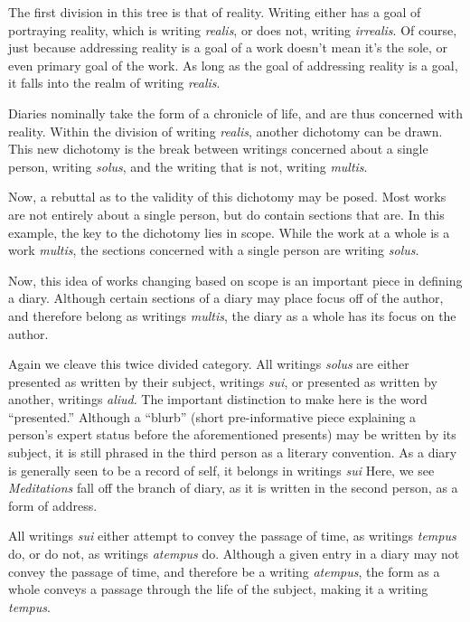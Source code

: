 \documentclass[12pt]{article}[titlepage]
\newcommand{\say}[1]{``#1''}
\newcommand{\1}{\={a}}
\newcommand{\2}{\={e}}
\newcommand{\3}{\={\i}}
\newcommand{\4}{\=o}
\newcommand{\5}{\=u}
\newcommand{\6}{\={A}}
\renewcommand{\,}{\textsuperscript{,}}
\begin{document}
The first division in this tree is that of reality.
Writing either has a goal of portraying reality, which is writing \textit{realis}, or does not, writing \textit{irrealis}.
Of course, just because addressing reality is a goal of a work doesn't mean it's the sole, or even primary goal of the work.
As long as the goal of addressing reality is a goal, it falls into the realm of writing \textit{realis}.

Diaries nominally take the form of a chronicle of life, and are thus concerned with reality.
Within the division of writing \textit{realis}, another dichotomy can be drawn.
This new dichotomy is the break between writings concerned about a single person, writing \textit{solus}, and the writing that is not, writing \textit{multis}.

Now, a rebuttal as to the validity of this dichotomy may be posed.
Most works are not entirely about a single person, but do contain sections that are.
In this example, the key to the dichotomy lies in scope.
While the work at a whole is a work \textit{multis}, the sections concerned with a single person are writing \textit{solus}.

Now, this idea of works changing based on scope is an important piece in defining a diary.
Although certain sections of a diary may place focus off of the author, and therefore belong as writings \textit{multis}, the diary as a whole has its focus on the author.

Again we cleave this twice divided category.
All writings \textit{solus} are either presented as written by their subject, writings \textit{sui}, or presented as written by another, writings \textit{aliud}.
The important distinction to make here is the word \say{presented.}
Although a \say{blurb} (short pre-informative piece explaining a person's expert status before the aforementioned presents) may be written by its subject, it is still phrased in the third person as a literary convention.
As a diary is generally seen to be a record of self, it belongs in writings \textit{sui}
Here, we see \textit{Meditations} fall off the branch of diary, as it is written in the second person, as a form of address. 

All writings \textit{sui} either attempt to convey the passage of time, as writings \textit{tempus} do, or do not, as writings \textit{atempus} do.
Although a given entry in a diary may not convey the passage of time, and therefore be a writing \textit{atempus}, the form as a whole conveys a passage through the life of the subject, making it a writing \textit{tempus}.
\end{document}
